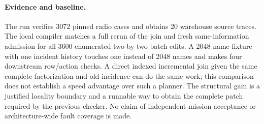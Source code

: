 \documentclass{article}
\begin{document}
\paragraph{Evidence and baseline.}
The run verifies 3072 pinned radio cases and obtains 20 warehouse source
traces. The local compiler matches a full rerun of the join and fresh
same-information admission for all 3600 enumerated two-by-two batch edits.
A 2048-name fixture with one incident history touches one instead of 2048
names and makes four downstream row/action checks. A direct indexed
incremental join given the same complete factorization and old incidence
can do the same work; this comparison does not establish a speed advantage
over such a planner. The structural gain is a justified locality boundary
and a runnable way to obtain the complete patch required by the previous
checker. No claim of independent mission acceptance or architecture-wide
fault coverage is made.
\end{document}
